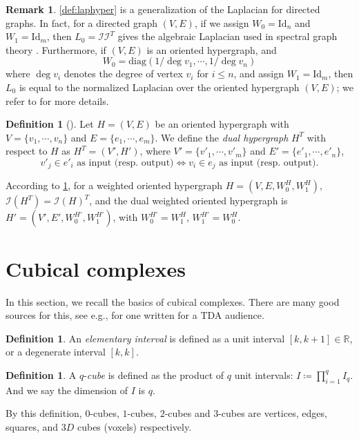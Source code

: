 \documentclass{article}
\theoremstyle{definition}
\newtheorem{definition}[theorem]{Definition}
\newtheorem{remark}[theorem]{Remark}
\newcommand{\diag}{\mathrm{diag}}
\newcommand{\id}{\mathrm{Id}}
\begin{document}
\begin{remark}
\cref{def:laphyper} is a generalization of the Laplacian for directed graphs.
In fact,
for a directed graph $(V, E)$,  
if we assign 
$W_0=\id_n$ and $W_1=\id_m$,
then $L_0=\mathcal{I}\mathcal{I}^T$ gives the algebraic Laplacian used in spectral graph theory \cite{MR1421568}.
Furthermore,
if $(V, E)$ is an oriented hypergraph,
and
\[W_0=\diag\left(1/\deg v_1,\cdots, 1/\deg v_n \right)\] where $\deg v_i$ denotes the degree of vertex $v_i$ for $i\leq n$,
and assign $W_1=\id_{m}$,
then $L_0$ is equal to the normalized Laplacian over the oriented hypergraph $(V, E)$; we refer to {\cite[Section 1.4]{MR4433789}} for more details.
   
\end{remark}

\begin{definition}[\cite{MR4236395}]\label{def_dual_hg}
Let $H=(V, E)$ be an oriented hypergraph with $V=\{v_1,\cdots, v_n\}$ and $E=\{e_1,\cdots, e_m\}$.
We define the \emph{dual hypergraph} $H^T$ with respect to $H$ as $H^T=(V', H')$,
where $V'=\{v'_1, \cdots, v'_m\}$ and $E'=\{e'_1, \cdots, e'_n\}$,
\[
v'_j\in e'_i \textrm{ as input (resp. output)} 
\Longleftrightarrow
v_i\in e_j \textrm{ as input (resp. output)}.
\]
\end{definition}
According to \cref{def_dual_hg},
for a weighted oriented hypergraph $H=(V, E, W_0^H, W_1^H)$,
$\mathcal{I}(H^T)=\mathcal{I}(H)^T$,
and the dual weighted oriented hypergraph is 
$H'=(V', E', W_0^{H'}, W_1^{H'})$,
with
$W_{0}^{H'}=W_{1}^{H}$,
$W_{1}^{H'}=W_{0}^H$.


\section{Cubical complexes}\label{appdx_cub_cplx}
In this section, we recall the basics of cubical complexes. There are many good sources for this, see e.g., \cite{MR3025945} for one written for a TDA audience.

\begin{definition}
An \emph{elementary interval} is defined as a unit interval $[k, k+1]\in \mathbb{R}$,
or a degenerate interval $[k, k]$.
\end{definition}

\begin{definition}
A $q$-\emph{cube} is defined as the product of $q$ unit intervals: $I\coloneqq \prod_{i=1}^q I_q$.
And we say the dimension of $I$ is $q$.
\end{definition}
By this definition,
$0$-cubes,
$1$-cubes,
$2$-cubes and $3$-cubes are vertices, edges, squares, and $3D$ cubes (voxels) respectively.
\end{document}
